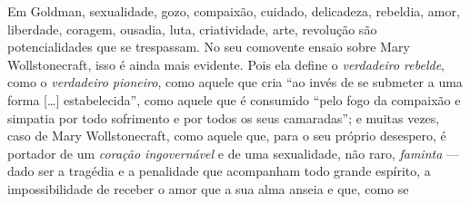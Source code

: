 Em Goldman, sexualidade, gozo,
compaixão, cuidado, delicadeza, rebeldia, amor, liberdade, coragem,
ousadia, luta, criatividade, arte, revolução são potencialidades que se
trespassam. No seu comovente ensaio sobre Mary Wollstonecraft, isso é
ainda mais evidente. Pois ela define o \textit{verdadeiro rebelde}, como o
\textit{verdadeiro pioneiro}, como aquele que cria ``ao invés de se
submeter a uma forma {[}\ldots{]} estabelecida'', como aquele que é
consumido ``pelo fogo da compaixão e simpatia por todo sofrimento e por
todos os seus camaradas''; e muitas vezes, caso de Mary Wollstonecraft,
como aquele que, para o seu próprio desespero, é portador de um
\textit{coração ingovernável} e de uma sexualidade, não raro, \textit{faminta} ---
dado ser a tragédia e a penalidade que acompanham todo grande espírito,
a impossibilidade de receber o amor que a sua alma anseia e que, como se
